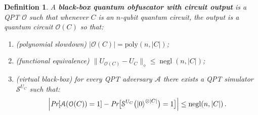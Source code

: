 \documentclass[11pt]{article}
\numberwithin{equation}{section}
\newtheorem{definition}{Definition}
\newcommand{\opn}{\operatorname}
\newcommand{\algo}{\mathcal}
\newcommand{\negl}{\opn{negl}}
\begin{document}
{\begin{definition}\label{def:blackboxcircuit}
A \textbf{black-box quantum obfuscator with circuit output} is a QPT $\algo O$ such that whenever $C$ is an $n$-qubit quantum circuit, the output is a quantum circuit $\algo O(C)$ so that:
\begin{enumerate}
\item (polynomial slowdown)  $|\algo O(C)| = \text{poly}(n, |C|)$;
\item (functional equivalence) $\bigl\| U_{\algo{O}(C)} - U_{C}\|_\diamond \leq \negl(n, |C|)$;
\item (virtual black-box) for every QPT adversary $\mathcal A$ there exists a QPT simulator $\mathcal S^{U_C}$ such that:
$$
\Bigl| \emph{Pr}[\mathcal A(\algo{O}(C)) = 1] - \emph{Pr}\bigl[\mathcal S^{U_C}\bigl(\ket{0}^{\otimes |C|}\bigr) = 1\bigr] \Bigr| \leq \negl(n, |C|)\,.
$$
\end{enumerate}
\end{definition}

}
\end{document}
